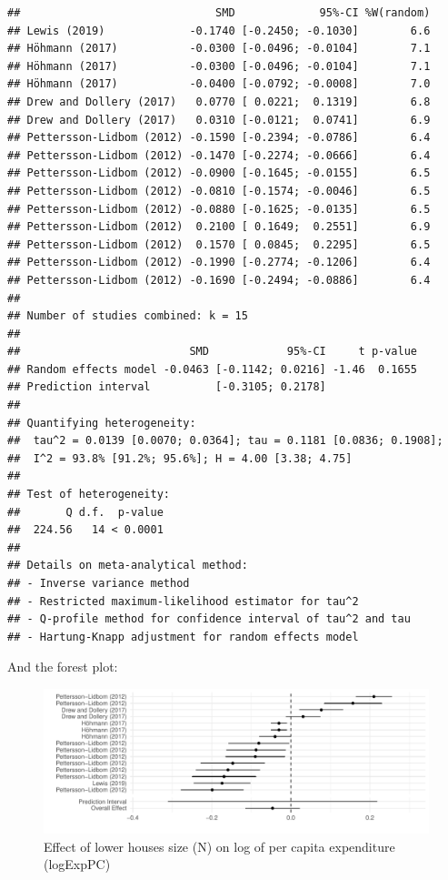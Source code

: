 \documentclass[
]{article}
\begin{document}
\begin{verbatim}
##                              SMD             95%-CI %W(random)
## Lewis (2019)             -0.1740 [-0.2450; -0.1030]        6.6
## Höhmann (2017)           -0.0300 [-0.0496; -0.0104]        7.1
## Höhmann (2017)           -0.0300 [-0.0496; -0.0104]        7.1
## Höhmann (2017)           -0.0400 [-0.0792; -0.0008]        7.0
## Drew and Dollery (2017)   0.0770 [ 0.0221;  0.1319]        6.8
## Drew and Dollery (2017)   0.0310 [-0.0121;  0.0741]        6.9
## Pettersson-Lidbom (2012) -0.1590 [-0.2394; -0.0786]        6.4
## Pettersson-Lidbom (2012) -0.1470 [-0.2274; -0.0666]        6.4
## Pettersson-Lidbom (2012) -0.0900 [-0.1645; -0.0155]        6.5
## Pettersson-Lidbom (2012) -0.0810 [-0.1574; -0.0046]        6.5
## Pettersson-Lidbom (2012) -0.0880 [-0.1625; -0.0135]        6.5
## Pettersson-Lidbom (2012)  0.2100 [ 0.1649;  0.2551]        6.9
## Pettersson-Lidbom (2012)  0.1570 [ 0.0845;  0.2295]        6.5
## Pettersson-Lidbom (2012) -0.1990 [-0.2774; -0.1206]        6.4
## Pettersson-Lidbom (2012) -0.1690 [-0.2494; -0.0886]        6.4
## 
## Number of studies combined: k = 15
## 
##                          SMD            95%-CI     t p-value
## Random effects model -0.0463 [-0.1142; 0.0216] -1.46  0.1655
## Prediction interval          [-0.3105; 0.2178]              
## 
## Quantifying heterogeneity:
##  tau^2 = 0.0139 [0.0070; 0.0364]; tau = 0.1181 [0.0836; 0.1908];
##  I^2 = 93.8% [91.2%; 95.6%]; H = 4.00 [3.38; 4.75]
## 
## Test of heterogeneity:
##       Q d.f.  p-value
##  224.56   14 < 0.0001
## 
## Details on meta-analytical method:
## - Inverse variance method
## - Restricted maximum-likelihood estimator for tau^2
## - Q-profile method for confidence interval of tau^2 and tau
## - Hartung-Knapp adjustment for random effects model
\end{verbatim}

And the forest plot:

\begin{figure}
\centering
\includegraphics{appendixV5_files/figure-latex/unnamed-chunk-37-1.pdf}
\caption{Effect of lower houses size (N) on log of per capita
expenditure (logExpPC)}
\end{figure}
\end{document}

